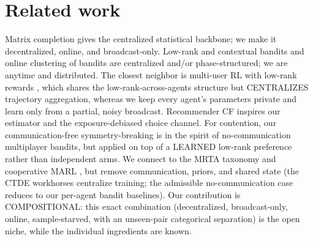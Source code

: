\documentclass[11pt]{article}
\theoremstyle{plain}
\begin{document}
\section{Related work}
Matrix completion \cite{candes2009exact,keshavan2010matrix,recht2011simpler,mazumder2010spectral}
gives the centralized statistical backbone; we make it decentralized, online, and
broadcast-only. Low-rank and contextual bandits
\cite{jun2019bilinear,katariya2017rank1,kang2024lowrank,li2010contextual,chapelle2011empirical}
and online clustering of bandits \cite{gentile2014online} are centralized and/or
phase-structured; we are anytime and distributed. The closest neighbor is multi-user RL
with low-rank rewards \cite{nagaraj2022multiuser}, which shares the low-rank-across-agents
structure but CENTRALIZES trajectory aggregation, whereas we keep every agent's parameters
private and learn only from a partial, noisy broadcast. Recommender CF
\cite{koren2009matrix,hu2008collaborative,salakhutdinov2008bayesian} inspires our estimator
and the exposure-debiased choice channel. For contention, our communication-free
symmetry-breaking is in the spirit of no-communication multiplayer bandits, but applied on
top of a LEARNED low-rank preference rather than independent arms. We connect to the MRTA
taxonomy \cite{gerkey2004formal} and cooperative MARL \cite{amato2024ctde}, but remove
communication, priors, and shared state (the CTDE workhorses centralize training; the
admissible no-communication case reduces to our per-agent bandit baselines). Our
contribution is COMPOSITIONAL: this exact combination (decentralized, broadcast-only,
online, sample-starved, with an unseen-pair categorical separation) is the open niche, while
the individual ingredients are known.
\end{document}
